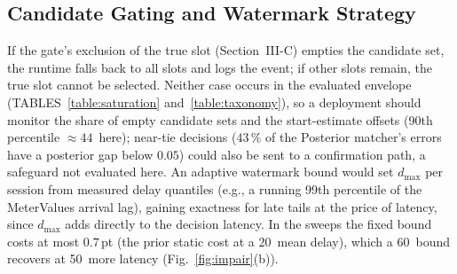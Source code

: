 \documentclass{ieeeaccess}
\newif\ifhighlight \highlightfalse
\DeclareRobustCommand{\revised}[1]{\ifhighlight{\color{blue}#1}\else{\color{.}#1}\fi}
\begin{document}
    \subsection{\revised{Candidate Gating and Watermark Strategy}}
    \revised{If the gate's exclusion of the true slot (Section~III-C) empties the candidate set, the runtime falls back to all slots and logs the event; if other slots remain, the true slot cannot be selected.
    Neither case occurs in the evaluated envelope (TABLES~\ref{table:saturation} and~\ref{table:taxonomy}), so a deployment should monitor the share of empty candidate sets and the start-estimate offsets (90th percentile $\approx 44$\,\text{sec} here); near-tie decisions ($43\,\%$ of the Posterior matcher's errors have a posterior gap below $0.05$) could also be sent to a confirmation path, a safeguard not evaluated here.
    An adaptive watermark bound would set $d_{\max}$ per session from measured delay quantiles (e.g., a running 99th percentile of the MeterValues arrival lag), gaining exactness for late tails at the price of latency, since $d_{\max}$ adds directly to the decision latency.
    In the sweeps the fixed bound costs at most $0.7$\,pt (the prior static cost at a 20\,\text{sec} mean delay), which a 60\,\text{sec} bound recovers at 50\,\text{sec} more latency (Fig.~\ref{fig:impair}(b)).}
\end{document}
